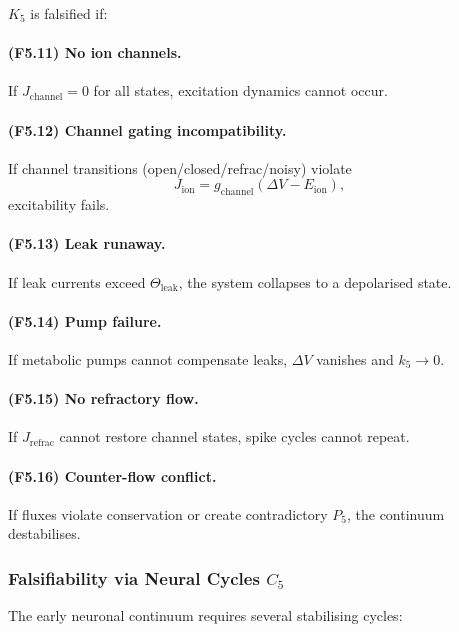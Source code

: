 $K_5$ is falsified if:

\paragraph{(F5.11) No ion channels.}
If $J_{\mathrm{channel}} = 0$ for all states,
excitation dynamics cannot occur.

\paragraph{(F5.12) Channel gating incompatibility.}
If channel transitions (open/closed/refrac/noisy) violate
\[
J_{\mathrm{ion}} = g_{\mathrm{channel}}(\Delta V - E_{\mathrm{ion}}),
\]
excitability fails.

\paragraph{(F5.13) Leak runaway.}
If leak currents exceed $\Theta_{\mathrm{leak}}$, the system collapses to
a depolarised state.

\paragraph{(F5.14) Pump failure.}
If metabolic pumps cannot compensate leaks,
$\Delta V$ vanishes and $k_5 \to 0$.

\paragraph{(F5.15) No refractory flow.}
If $J_{\mathrm{refrac}}$ cannot restore channel states,
spike cycles cannot repeat.

\paragraph{(F5.16) Counter-flow conflict.}
If fluxes violate conservation or create contradictory $P_5$,
the continuum destabilises.



\subsubsection{Falsifiability via Neural Cycles \texorpdfstring{$C_5$}{C_5}}

The early neuronal continuum requires several stabilising cycles:

